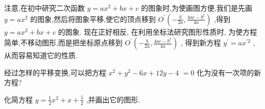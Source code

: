 \documentclass[lang=cn,newtx,10pt,scheme=chinese]{elegantbook}
\begin{document}
注意,在初中研究二次函数 \(y = a{x}^{2} + {bx} + c\) 的图象时,为使画图方便,我们是先画 \(y = a{x}^{2}\) 的图象,然后将图象平移,使它的顶点移到 \({O}^{\prime }\left( {-\frac{b}{2a},\frac{{4ac} - {b}^{2}}{4a}}\right)\) ,得到 \(y = a{x}^{2} + {bx} + c\) 的图象. 现在正好相反, 在利用坐标法研究图形性质时, 为使方程简单,不移动图形,而是把坐标原点移到 \({O}^{\prime }\left( {-\frac{b}{2a},\frac{{4ac} - {b}^{2}}{4a}}\right)\) , 得到新方程 \({y}^{\prime } = a{x}^{\prime 2}\) ,从而容易知道它的性质.

\begin{problemset}[练习]

\item 经过怎样的平移变换,可以把方程 \({x}^{2} + {y}^{2} - {6x} + {12y} - 4\) \(= 0\) 化为没有一次项的新方程?

\item 化简方程 \(y = \frac{1}{2}{x}^{2} + x + \frac{5}{2}\) ,并画出它的图形.

\end{problemset}
\end{document}
